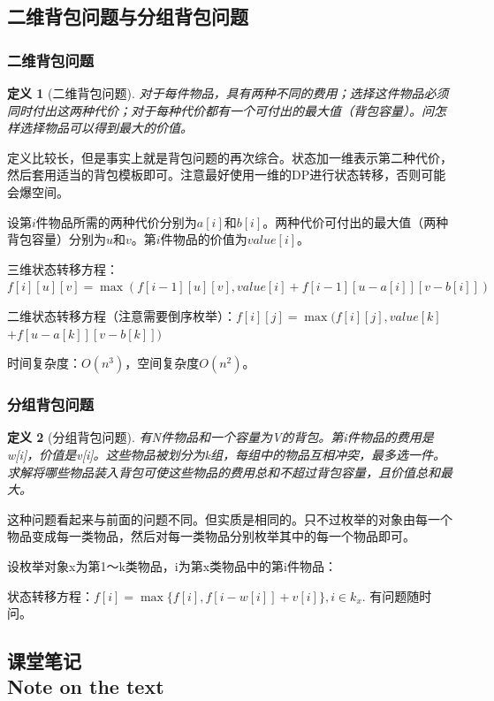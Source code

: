 \documentclass{article}
\newtheorem{definition}{定义}[subsection]
\theoremstyle{nonumberplain}
\newcommand{\note}{\ \par
	\subsection*{课堂笔记\\\tiny{Note on the text}}
	\newpage}
\begin{document}
\subsection{二维背包问题与分组背包问题}
\subsubsection{二维背包问题}
\begin{definition}[二维背包问题]对于每件物品，具有两种不同的费用；选择这件物品必须同时付出这两种代价；对于每种代价都有一个可付出的最大值（背包容量）。问怎样选择物品可以得到最大的价值。\end{definition}

定义比较长，但是事实上就是背包问题的再次综合。状态加一维表示第二种代价，然后套用适当的背包模板即可。注意最好使用一维的DP进行状态转移，否则可能会爆空间。


设第$i$件物品所需的两种代价分别为$a[i]$和$b[i]$。两种代价可付出的最大值（两种背包容量）分别为$u$和$v$。第$i$件物品的价值为$value[i]$。

三维状态转移方程：$f[i][u][v] = \max(f[i-1][u][v] , value[i] + f[i-1][u-a[i]][v-b[i]])$

二维状态转移方程（注意需要倒序枚举）：$f[i][j] = \max(f[i][j] , value[k]$ $+ f[u-a[k]][v-b[k]])$

时间复杂度：$O(n^3)$，空间复杂度$O(n^2)$。

\subsubsection{分组背包问题}
\begin{definition}[分组背包问题]有N件物品和一个容量为V的背包。第i件物品的费用是w[i]，价值是v[i]。这些物品被划分为k组，每组中的物品互相冲突，最多选一件。求解将哪些物品装入背包可使这些物品的费用总和不超过背包容量，且价值总和最大。\end{definition}

这种问题看起来与前面的问题不同。但实质是相同的。只不过枚举的对象由每一个物品变成每一类物品，然后对每一类物品分别枚举其中的每一个物品即可。

设枚举对象x为第1～k类物品，i为第x类物品中的第i件物品：

状态转移方程：$f[i]=\max\{f[i],f[i-w[i]]+v[i]\},i\in k_x.$
有问题随时问。
\note
\end{document}
